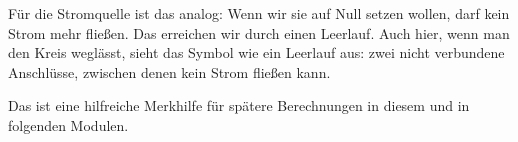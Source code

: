 \begin{frame}
{        Für die Stromquelle ist das analog: 
        Wenn wir sie auf Null setzen wollen, darf kein Strom mehr fließen. 
        Das erreichen wir durch einen Leerlauf. Auch hier, wenn man den Kreis weglässt, 
        sieht das Symbol wie ein Leerlauf aus: zwei nicht verbundene Anschlüsse, zwischen denen kein Strom fließen kann.
        
        Das ist eine hilfreiche Merkhilfe für spätere Berechnungen in diesem und in folgenden Modulen.
    }
    
\end{frame}

